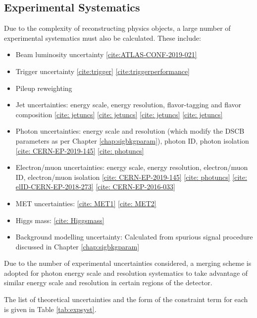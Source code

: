 \subsection{Experimental Systematics}

Due to the complexity of reconstructing physics objects, a large number of experimental systematics must also be calculated.
These include:

\begin{itemize}
\item Beam luminosity uncertainty \ref{cite:ATLAS-CONF-2019-021}
\item Trigger uncertainty \ref{cite:trigger} \ref{cite:triggerperformance}
\item Pileup reweighting
\item Jet uncertainties: energy scale, energy resolution,  flavor-tagging and flavor composition \ref{cite: jetuncs} \ref{cite: jetuncs} \ref{cite: jetuncs} \ref{cite: jetuncs}
\item Photon uncertainties: energy scale and resolution (which modify the DSCB parameters as per Chapter \ref{chap:sigbkgparam}), photon ID, photon isolation \ref{cite: CERN-EP-2019-145} \ref{cite: photuncs}
\item Electron/muon uncertainties: energy scale, energy resolution, electron/muon ID, electron/muon isolation \ref{cite: CERN-EP-2019-145} \ref{cite: photuncs} \ref{cite: elID-CERN-EP-2018-273} \ref{cite: CERN-EP-2016-033}
\item MET uncertainties: \ref{cite: MET1} \ref{cite: MET2}
\item Higgs mass: \ref{cite: Higgsmass}
\item Background modelling uncertainty: Calculated from spurious signal procedure discussed in Chapter \ref{chap:sigbkgparam}
\end{itemize}

Due to the number of experimental uncertainties considered, a merging scheme is adopted for photon energy scale and resolution systematics to take advantage of similar energy scale and resolution in certain regions of the detector.

The list of theoretical uncertainties and the form of the constraint term for each is given in Table \ref{tab:expsyst}.


